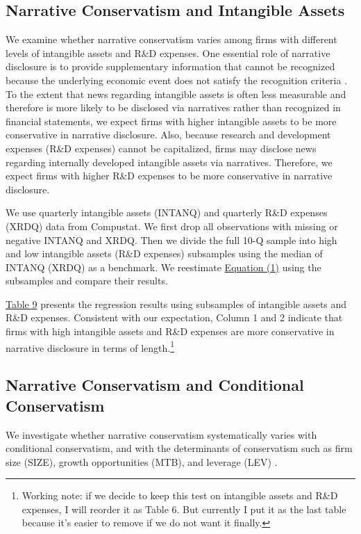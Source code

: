 \documentclass[letterpaper,12pt]{article}
\begin{document}
\begin{spacing}{1.5}
\subsection{Narrative Conservatism and Intangible Assets}
\noindent We examine whether narrative conservatism varies among firms with different levels of intangible assets and R\&D expenses. One essential role of narrative disclosure is to provide supplementary information that cannot be recognized because the underlying economic event does not satisfy the recognition criteria \cite{fasbStatementFinancialAccounting1984}. To the extent that news regarding intangible assets is often less measurable and therefore is more likely to be disclosed via narratives rather than recognized in financial statements, we expect firms with higher intangible assets to be more conservative in narrative disclosure. Also, because research and development expenses (R\&D expenses) cannot be capitalized, firms may disclose news regarding internally developed intangible assets via narratives. Therefore,  we expect firms with higher R\&D expenses to be more conservative in narrative disclosure.

We use quarterly intangible assets (INTANQ) and quarterly R\&D expenses (XRDQ) data from Compustat. We first drop all observations with missing or negative INTANQ and XRDQ. Then we divide the full 10-Q sample into high and low intangible assets (R\&D expenses) subsamples using the median of INTANQ (XRDQ) as a benchmark. We reestimate \hyperref[eq1]{Equation (1)} using the subsamples and compare their results.

\hyperref[T9]{Table 9} presents the regression results using subsamples of intangible assets and R\&D expenses. Consistent with our expectation, Column 1 and 2 indicate that firms with high intangible assets and R\&D expenses are more conservative in narrative disclosure in terms of length.\footnote{Working note: if we decide to keep this test on intangible assets and R\&D expenses, I will reorder it as Table 6. But currently I put it as the last table because it's easier to remove if we do not want it finally.}

\subsection{Narrative Conservatism and Conditional Conservatism}
\noindent We investigate whether narrative conservatism systematically varies with conditional conservatism, and with the determinants of conservatism such as firm size (SIZE), growth opportunities (MTB), and leverage (LEV) \cite{wattsConservatismAccountingPart2003, qiangEffectsContractingLitigation2007, khanEstimationEmpiricalProperties2009, laraEconomicDeterminantsConditional2009}.  


\end{spacing}
\end{document}
